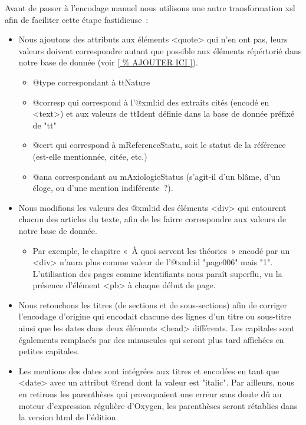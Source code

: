 \documentclass[12pt, a4paper]{article}
\begin{document}
Avant de passer à l'encodage manuel nous utilisons une autre transformation xsl afin de faciliter cette étape fastidieuse~:
\begin{itemize}
    \item Nous ajoutons des attributs aux éléments <quote> qui n'en ont pas, leurs valeurs doivent correspondre autant que possible aux éléments répértorié dans notre base de donnée (voir \ref{
    }).
    \begin{itemize}
        \item @type correspondant à ttNature
        \item @corresp qui correspond à l'@xml:id des extraits cités (encodé en <text>) et aux valeurs de ttIdent définie dans la base de donnée préfixé de "tt"
        \item @cert qui correspond à mReferenceStatu, soit le statut de la référence (est-elle mentionnée, citée, etc.)
        \item @ana correspondant au mAxiologicStatus (s'agit-il d'un blâme, d'un éloge, ou d'une mention indiférente~?).
    \end{itemize}
    \item Nous modifions les valeurs des @xml:id des éléments <div> qui entourent chacun des articles du texte, afin de les fairre correspondre aux valeurs de notre base de donnée.
        \begin{itemize}
            \item Par exemple, le chapitre « À quoi servent les théories » encodé par un <div> n'aura plus comme valeur de l'@xml:id "page006" mais "1". L'utilisation des pages comme identifiants nous paraît superflu, vu la présence d'élément <pb> à chaque début de page.
        \end{itemize}
    \item Nous retouchons les titres (de sections et de sous-sections) afin de corriger l'encodage d'origine qui encodait chacune des lignes d'un titre ou sous-titre ainsi que les dates dans deux éléments <head> différents. Les capitales sont égalements remplacés par des minuscules qui seront plus tard affichées en petites capitales.
    \item Les mentions des dates sont intégrées aux titres et encodées en tant que <date> avec un attribut @rend dont la valeur est "italic". Par ailleurs, nous en retirons les parenthèses qui provoquaient une erreur sans doute dû au moteur d'expression régulière d'Oxygen, les parenthèses seront rétablies dans la version html de l'édition.

\end{itemize}
\end{document}
